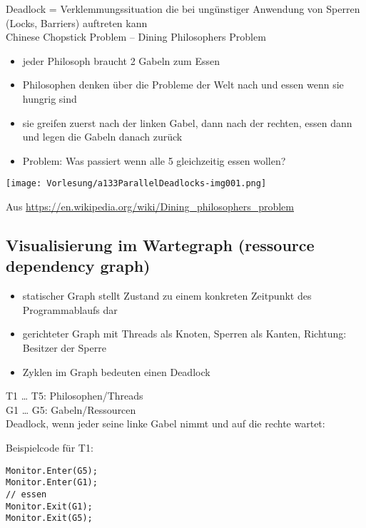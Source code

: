 Deadlock = Verklemmungssituation die bei ungünstiger Anwendung von Sperren (Locks, Barriers) auftreten kann\\
Chinese Chopstick Problem -- Dining Philosophers Problem
\begin{itemize}
\item jeder Philosoph braucht 2 Gabeln zum Essen
\item Philosophen denken über die Probleme der Welt nach und essen wenn sie hungrig sind
\item sie greifen zuerst nach der linken Gabel, dann nach der rechten, essen dann und legen die Gabeln danach zurück
\item Problem: Was passiert wenn alle 5 gleichzeitig essen wollen? 
\end{itemize}
\begin{center}
\texttt{[image: Vorlesung/a133ParallelDeadlocks-img001.png]}
\end{center} 
Aus \url{https://en.wikipedia.org/wiki/Dining_philosophers_problem}

\subsection{Visualisierung im Wartegraph (ressource dependency graph)}
\begin{itemize}
\item statischer Graph stellt Zustand zu einem konkreten Zeitpunkt des Programmablaufs dar
\item gerichteter Graph mit Threads als Knoten, Sperren als Kanten, Richtung: Besitzer der Sperre
\item Zyklen im Graph bedeuten einen Deadlock
\end{itemize}
T1 … T5: Philosophen/Threads\\
G1 … G5: Gabeln/Ressourcen\\
Deadlock, wenn jeder seine linke Gabel nimmt und auf die rechte wartet:
\begin{center}
\end{center}
Beispielcode für T1:
\begin{lstlisting}[language={[Sharp]C}]
Monitor.Enter(G5);
Monitor.Enter(G1);
// essen
Monitor.Exit(G1);
Monitor.Exit(G5);
\end{lstlisting}


